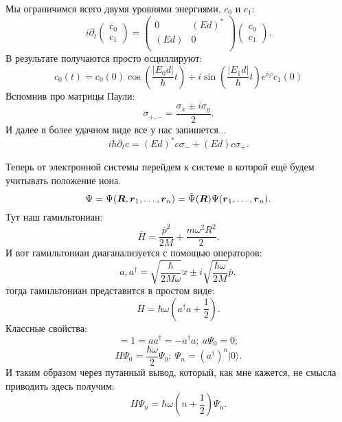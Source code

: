 Мы ограничимся всего двумя уровнями энергиями, $c_0$ и $c_1$:
\begin{equation*}
	i \partial_t \begin{pmatrix} c_0 \\ c_1 \end{pmatrix} = \begin{pmatrix}
	    0 & (E d)^* \\
	    (E d) & 0 \\
	\end{pmatrix} \begin{pmatrix} c_0 \\ c_1 \end{pmatrix}.
\end{equation*}
В результате получаются просто осциллируют:
\begin{equation*}
	c_0(t) = c_0 (0) \cos \left(\frac{|E_0 d|}{\hbar} t\right) + i \sin \left(\frac{|E_1 d|}{\hbar}t\right) e^{i \varphi} c_1 (0)
\end{equation*}
Вспомнив про матрицы Паули:
\begin{equation*}
	\sigma_{+,-} = \frac{\sigma_x \pm i \sigma_y}{2}.
\end{equation*}
И далее в более удачном виде все у нас запишется...
\begin{equation*}
	i \hbar \partial_t c = (E d)^* c \sigma_- + (E d) c \sigma_+.
\end{equation*}



Теперь от электронной системы перейдем к системе в которой ещё будем учитывать положение иона.
\begin{equation*}
	\Psi = \Psi(\mbox{\boldmath $R$}, \mbox{\boldmath $r$}_1, \ldots, \mbox{\boldmath $r$}_n) = \tilde{\Psi}(\mbox{\boldmath $R$}) \Psi(\mbox{\boldmath $r$}_1, \ldots, \mbox{\boldmath $r$}_n).
\end{equation*}
Тут наш гамильтониан:
\begin{equation*}
	\bar{H} = \frac{\bar{p}^2}{2 M} + \frac{m \omega^2 R^2}{2}.
\end{equation*}
И вот гамильтониан диаганализуется с помощью операторов:
\begin{equation*}
	a, a^{\dag} = \sqrt{\frac{\hbar}{2 M \omega}}x \pm i \sqrt{\frac{\hbar \omega}{2M}} \bar{p},
\end{equation*}
тогда гамильтониан представится в простом виде:
\begin{equation*}
	H = \hbar \omega \left(a^\dag a + \frac{1}{2}\right).
\end{equation*}
Классные свойства:
\begin{equation*}
	[a, a^\dag] = 1 = a a^\dag =- a^\dag a;
	\ a \Psi_0 = 0;
\end{equation*}
\begin{equation*}
	H \Psi_0 = \frac{\hbar \omega}{2} \Psi_0;
	\
	\Psi_n = (a^\dag)^n | 0 \rangle.
\end{equation*}
И таким образом через путанный вывод, который, как мне кажется, не смысла приводить здесь получим:
\begin{equation*}
	H \Psi_n = \hbar \omega \left(n + \frac{1}{2}\right) \Psi_n.
\end{equation*}

